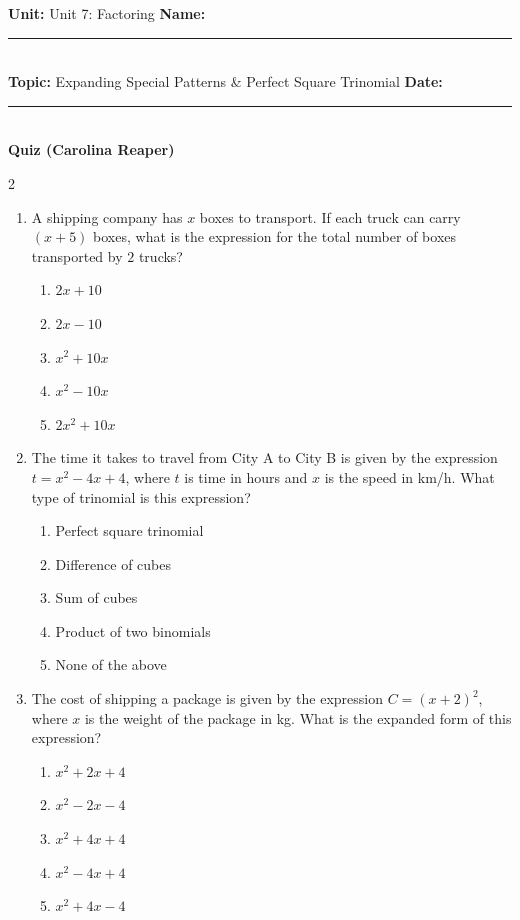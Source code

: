\documentclass[10pt]{article}
\begin{document}
\enlargethispage{2.5cm}

\begin{tcolorbox}[colback=mainblue!5, colframe=mainblue, sharp corners, boxrule=0.5pt]
    \small \textbf{Unit:}  Unit 7: Factoring \hfill \textbf{Name:} \rule{3cm}{0.4pt} \\
    \small \textbf{Topic:} Expanding Special Patterns & Perfect Square Trinomial \hfill \textbf{Date:} \rule{2cm}{0.4pt} \\
    \centering \textbf{\large Quiz (Carolina Reaper)}
\end{tcolorbox}

\vspace{0.2cm}

\begin{multicols}{2}
\begin{enumerate}[label=\textbf{Q\arabic*.}, leftmargin=*, itemsep=6pt, parsep=0pt]

  \item \small A shipping company has $x$ boxes to transport. If each truck can carry $(x + 5)$ boxes, what is the expression for the total number of boxes transported by $2$ trucks?
  \begin{enumerate}[label=(\Alph*), leftmargin=0.6cm, nosep, itemsep=2pt]
    \item $2x + 10$
    \item $2x - 10$
    \item $x^2 + 10x$
    \item $x^2 - 10x$
    \item $2x^2 + 10x$
  \end{enumerate}

  \item \small The time it takes to travel from City A to City B is given by the expression $t = x^2 - 4x + 4$, where $t$ is time in hours and $x$ is the speed in km/h. What type of trinomial is this expression?
  \begin{enumerate}[label=(\Alph*), leftmargin=0.6cm, nosep, itemsep=2pt]
    \item Perfect square trinomial
    \item Difference of cubes
    \item Sum of cubes
    \item Product of two binomials
    \item None of the above
  \end{enumerate}

  \item \small The cost of shipping a package is given by the expression $C = (x + 2)^2$, where $x$ is the weight of the package in kg. What is the expanded form of this expression?
  \begin{enumerate}[label=(\Alph*), leftmargin=0.6cm, nosep, itemsep=2pt]
    \item $x^2 + 2x + 4$
    \item $x^2 - 2x - 4$
    \item $x^2 + 4x + 4$
    \item $x^2 - 4x + 4$
    \item $x^2 + 4x - 4$
  \end{enumerate}


\end{enumerate}
\end{multicols}
\end{document}
